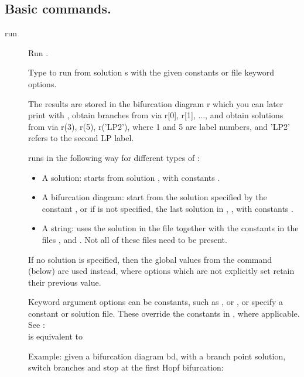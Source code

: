 \documentclass[12pt]{report}
\begin{document}
\subsection{Basic commands.} \label{sec:clui_ref_basic}
\begin{description}
\item[run]
Run \AUTO.

    Type  to run \AUTO from solution s with the given
    \AUTO constants or file keyword options.
    
    The results are stored in the bifurcation diagram r which you can
    later print with , obtain branches from via r[0], r[1], ...,
    and obtain solutions from via r(3), r(5), r('LP2'), where 1 and 5
    are label numbers, and 'LP2' refers to the second LP label.

     runs \AUTO in the following way for different types of :
    \begin{itemize}
    \item
      A solution: \AUTO starts from solution , with \AUTO constants .
    \item
      A bifurcation diagram: \AUTO start from the solution specified by
      the \AUTO constant , or if  is not specified, the last solution
      in , , with \AUTO constants .
    \item
      A string: \AUTO uses the solution in the file  together with the
      constants in the files , and . Not all of these
      files need to be present.
    \end{itemize}

    If no solution  is specified, then the global values from the
     command (below) are used instead, where
    options which are not explicitly set retain their previous value.

    Keyword argument options can be \AUTO constants, such as ,
    or , or specify a constant or solution file. These override
    the constants in , where applicable. See :\\
     is equivalent to 

    Example: given a bifurcation diagram bd, with a branch point
    solution, switch branches and stop at the first Hopf bifurcation:\\
    

\end{description}
\end{document}
